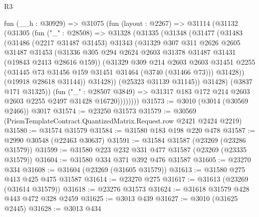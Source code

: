 \begin{lexlean}{R3}
\begin{coremodule}
          fun (__h : @30929) =>
          @31075
            (fun (layout : @2267) =>
            @31114
              (@31132
                (@31305
                  (fun ("_" : @28508) =>
                  @31328
                    (@31335
                      (@31348
                        (@31477
                          (@31483
                            (@31486
                              (@2217 @31487 @31453)
                              @31343
                              (@31329
                                @307
                                @311
                                @2626
                                @2605
                                @31487
                                @31453
                                (@31336
                                  @305
                                  @294
                                  @2624
                                  @2603
                                  @31378
                                  @31487
                                  @31431
                                  (@19843 @2413 @28616 @159))
                                (@31329
                                  @309
                                  @214
                                  @2603
                                  @2603
                                  @31451
                                  @2255
                                  (@31445 @73 @31456 @159 @31451 @31464 (@3740 (@31466 @73)))
                                  @31428))
                              (@19918 @28618 @31144))
                            @31428))
                        (@25323 @31139 @31145))
                      @31428)
                    (@3837 @171 @31325))
                  (fun ("_" : @28507 @3849) =>
                  @31317 @183 @172 @214 @2603 @2603 @2255 @2497 @31428 @16720))))))))
@31573 := @3010 (@3014 (@30569 @2466)) @3017
@31574 := @23250 @31573
@31579 := @30569 (PrismTemplateContract.QuantizedMatrix.Request.row @2421 @2424 @2219)
@31580 := @31574 @31579
@31584 := @31580 @183 @198 @220 @478
@31587 := @2990 @30548 (@22463 @30637)
@31591 := @31584 @31587 (@23269 (@23286 @31579))
@31599 := @31580 @223 @232 @331 @477 @31587 (@23269 (@23335 @31579))
@31604 := @31580 @334 @371 @392 @476 @31587
@31605 := @23270 @334
@31608 := @31604 (@23269 (@31605 @31579))
@31613 := @31580 @275 @413 @425 @475 @31587
@31614 := @23270 @275
@31617 := @31613 (@23269 (@31614 @31579))
@31618 := @23276 @31573
@31624 := @31618 @31579 @428 @443 @472 @328 @2459
@31625 := @3013 @439
@31627 := @3010 (@31625 @2445)
@31628 := @3013 @434

\end{coremodule}
\end{lexlean}
